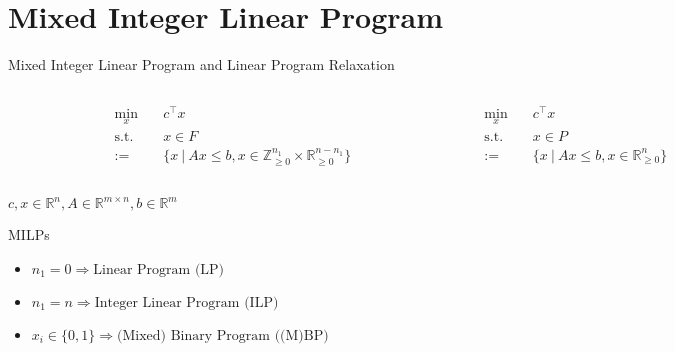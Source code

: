 \section{Mixed Integer Linear Program}

\begin{frame}{Mixed Integer Linear Program and Linear Program Relaxation}
\small
\begin{columns}

	\begin{figure}
	\centering
	
	\end{figure}
	
	\begin{tcolorbox}[colback=white, title={MILP (standard form)}]
    \begin{align*}
    	\min_{x}\quad &c^\top x \\
    	\text{s.t.}\quad & x\in F \\
    	:= &\{x \:\vert\: Ax \leq b, x \in \mathbb{Z}_{\geq 0}^{n_1} \times \mathbb{R}_{\geq 0}^{n-n_1} \}
    \end{align*}
    \end{tcolorbox}

	\begin{figure}
	\centering
	
	\end{figure}
	
	\begin{tcolorbox}[colback=white, title={LP Relaxation}]
    \begin{align*}
    	\min_{x}\quad &c^\top x \\
    	\text{s.t.}\quad &x \in P\\
    	:= &\{x \:\vert\: Ax \leq b, x \in \mathbb{R}_{\geq 0}^{n}\}
    \end{align*}
    \end{tcolorbox}
\end{columns}
$c,x \in \mathbb{R}^n, A \in \mathbb{R}^{m \times n}, b \in \mathbb{R}^m$
\end{frame}



\begin{frame}{MILPs}
\begin{itemize}
\item $n_1 = 0 \Rightarrow \text{Linear Program (LP)}$
\item $n_1 = n \Rightarrow \text{Integer Linear Program (ILP)}$
\item $x_i \in \{0,1\}\Rightarrow \text{(Mixed) Binary Program ((M)BP)}$
\end{itemize}
\end{frame}


